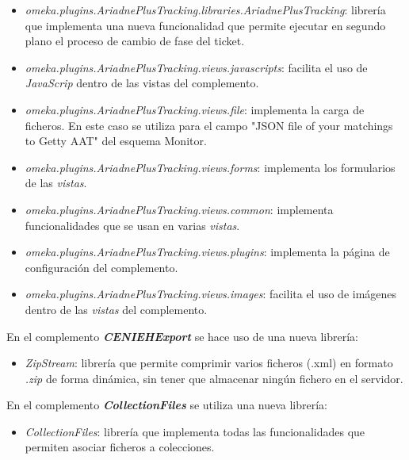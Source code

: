 \begin{itemize}
\tightlist
\item
  \emph{omeka.plugins.AriadnePlusTracking.libraries.AriadnePlusTracking}:
  librería que implementa una nueva funcionalidad que permite ejecutar
  en segundo plano el proceso de cambio de fase del ticket.
\item
  \emph{omeka.plugins.AriadnePlusTracking.views.javascripts}: facilita
  el uso de \emph{JavaScrip} dentro de las vistas del complemento.
\item
  \emph{omeka.plugins.AriadnePlusTracking.views.file}: implementa la
  carga de ficheros. En este caso se utiliza para el campo "JSON file of
  your matchings to Getty AAT" del esquema Monitor.
\item
  \emph{omeka.plugins.AriadnePlusTracking.views.forms}: implementa los
  formularios de las \emph{vistas}.
\item
  \emph{omeka.plugins.AriadnePlusTracking.views.common}: implementa
  funcionalidades que se usan en varias \emph{vistas}.
\item
  \emph{omeka.plugins.AriadnePlusTracking.views.plugins}: implementa la
  página de configuración del complemento.
\item
  \emph{omeka.plugins.AriadnePlusTracking.views.images}: facilita el uso
  de imágenes dentro de las \emph{vistas} del complemento.
\end{itemize}


En el complemento \textbf{\emph{CENIEHExport}} se hace uso de una nueva librería:

\begin{itemize}
\tightlist
\item
  \emph{ZipStream}: librería que permite comprimir varios ficheros
  (.xml) en formato \emph{.zip} de forma dinámica, sin tener que
  almacenar ningún fichero en el servidor.
\end{itemize}


En el complemento \textbf{\emph{CollectionFiles}} se utiliza una nueva librería:

\begin{itemize}
\tightlist
\item
  \emph{CollectionFiles}: librería que implementa todas las
  funcionalidades que permiten asociar ficheros a colecciones.
\end{itemize}

